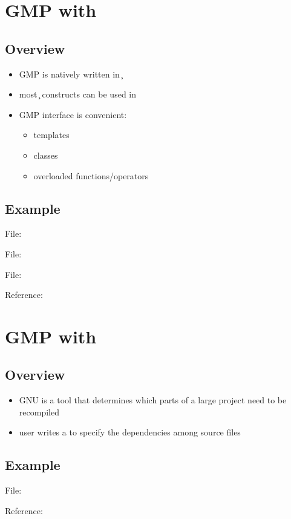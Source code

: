 \section{GMP with \cpp}

\subsection{Overview}

\begin{itemize}
\item GMP is natively written in \c
\item most \c{} constructs can be used in \cpp
\item GMP \cpp{} interface is convenient:
  \begin{itemize}
  \item templates
  \item classes
  \item overloaded functions/operators
  \end{itemize}
\end{itemize}

\subsection{Example}

File: 
\codes{}

File: 
\codes{}

File: 
\codes{}

Reference: \cite{gmp}


\section{GMP with \make}

\subsection{Overview}

\begin{itemize}
\item GNU \make{} is a tool that determines
  which parts of a large project need to be recompiled
\item user writes a  to specify
  the dependencies among source files
\end{itemize}

\subsection{Example}

File: 
\codes{}

Reference: \cite{make}
